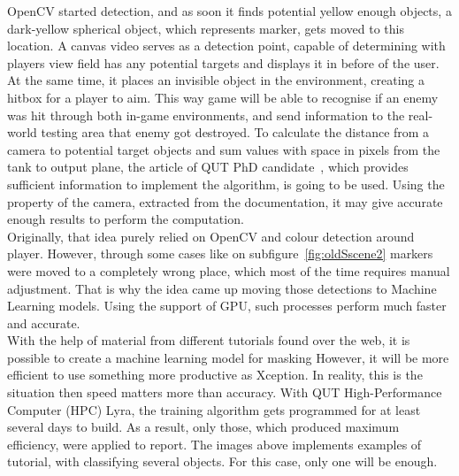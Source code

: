     OpenCV started detection, and as soon it finds potential yellow enough objects, a dark-yellow spherical object, which represents marker, gets moved to this location.
    A canvas video serves as a detection point, capable of determining with players view field has any potential targets and displays it in before of the user.
    At the same time, it places an invisible object in the environment, creating a hitbox for a player to aim. 
    This way game will be able to recognise if an enemy was hit through both in-game environments, and send information to the real-world testing area that enemy got destroyed.
    To calculate the distance from a camera to potential target objects and sum values with space in pixels from the tank to output plane, the article of QUT PhD candidate~\cite{sandino_estimation_nodate}, which provides sufficient information to implement the algorithm, is going to be used.
    Using the property of the camera, extracted from the documentation, it may give accurate enough results to perform the computation. \\[1pt]
    Originally, that idea purely relied on OpenCV and colour detection around player.
    However, through some cases like on subfigure~\ref{fig:oldSscene2} markers were moved to a completely wrong place, which most of the time requires manual adjustment.
    That is why the idea came up moving those detections to Machine Learning models.
    Using the support of GPU, such processes perform much faster and accurate. \\
	With the help of material from different tutorials found over the web, it is possible to create a machine learning model for masking 
    However, it will be more efficient to use something more productive as Xception.
    In reality, this is the situation then speed matters more than accuracy.
    With QUT High-Performance Computer (HPC) Lyra, the training algorithm gets programmed for at least several days to build.
    As a result, only those, which produced maximum efficiency, were applied to report.
    The images above implements examples of~\cite{anuj_shah_tutorial_nodate} tutorial, with classifying several objects. For this case, only one will be enough.